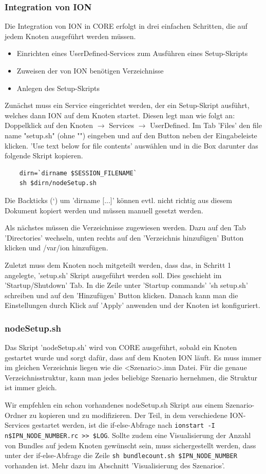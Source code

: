 \documentclass{article}
\begin{document}
\subsubsection{Integration von ION}
Die Integration von ION in CORE erfolgt in drei einfachen Schritten, die auf jedem Knoten ausgeführt werden müssen.
\begin{itemize}
\item Einrichten eines UserDefined-Services zum Ausführen eines Setup-Skripts
\item Zuweisen der von ION benötigen Verzeichnisse
\item Anlegen des Setup-Skripts
\end{itemize}\par
Zunächst muss ein Service eingerichtet werden, der ein Setup-Skript ausführt, welches dann ION auf dem Knoten startet. Diesen legt man wie folgt an: Doppelklick auf den Knoten $\rightarrow$ Services $\rightarrow$ UserDefined. Im Tab 'Files' den file name "setup.sh" (ohne "") eingeben und auf den Button neben der Eingabeleiste klicken. 'Use text below for file contents' auswählen und in die Box darunter das folgende Skript kopieren.
\begin{verbatim}
    dirn=`dirname $SESSION_FILENAME`
    sh $dirn/nodeSetup.sh
\end{verbatim}
Die Backticks (`) um 'dirname [...]' können evtl. nicht richtig aus diesem Dokument kopiert werden und müssen manuell gesetzt werden.\par
Als nächstes müssen die Verzeichnisse zugewiesen werden. Dazu auf den Tab 'Directories' wechseln, unten rechts auf den 'Verzeichnis hinzufügen' Button klicken und /var/ion hinzufügen.\par
Zuletzt muss dem Knoten noch mitgeteilt werden, dass das, in Schritt 1 angelegte, 'setup.sh' Skript ausgeführt werden soll. Dies geschieht im 'Startup/Shutdown' Tab. In die Zeile unter 'Startup commands' 'sh setup.sh' schreiben und auf den 'Hinzufügen' Button klicken. Danach kann man die Einstellungen durch Klick auf 'Apply' anwenden und der Knoten ist konfiguriert.
\subsubsection{nodeSetup.sh}
Das Skript 'nodeSetup.sh' wird von CORE ausgeführt, sobald ein Knoten gestartet wurde und sorgt dafür, dass auf dem Knoten ION läuft. Es muss immer im gleichen Verzeichnis liegen wie die <Szenario>.imn Datei. Für die genaue Verzeichnisstruktur, kann man jedes beliebige Szenario hernehmen, die Struktur ist immer gleich.\par
Wir empfehlen ein schon vorhandenes nodeSetup.sh Skript aus einem Szenario-Ordner zu kopieren und zu modifizieren. Der Teil, in dem verschiedene ION-Services gestartet werden, ist die if-else-Abfrage nach \texttt{ionstart -I n\$IPN\_NODE\_NUMBER.rc >> \$LOG}. Sollte zudem eine Visualisierung der Anzahl von Bundles auf jedem Knoten gewünscht sein, muss sichergestellt werden, dass unter der if-else-Abfrage die Zeile \texttt{sh bundlecount.sh \$IPN\_NODE\_NUMBER} vorhanden ist. Mehr dazu im Abschnitt 'Visualisierung des Szenarios'.
\end{document}
